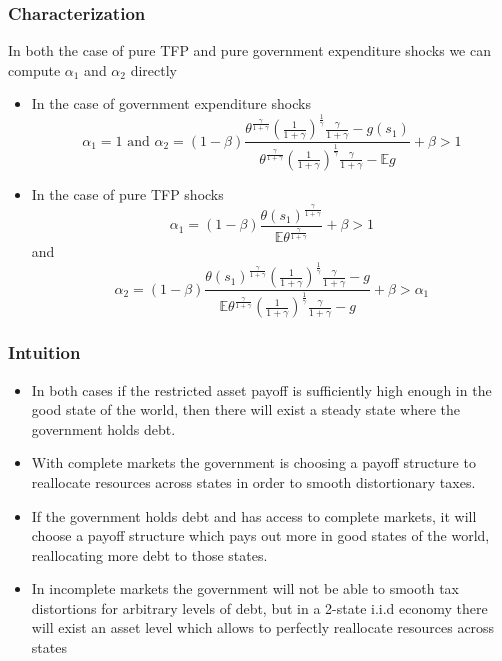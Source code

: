 \documentclass{beamer}
\newcommand{\EE}{\mathbb E}
\begin{document}
\begin{frame}
 \frametitle{Characterization}
	In both the case of pure TFP and pure government expenditure shocks we can compute $\alpha_1$ and $\alpha_2$ directly
	\begin{itemize}
		\item In the case of government expenditure shocks
		\[
			\alpha_1 = 1 \text{  and }  \alpha_2 = (1-\beta)\frac{\theta^\frac{\gamma}{1+\gamma}\left(\frac{1}{1+\gamma}\right)^\frac1\gamma\frac{\gamma}{1+\gamma}-g(s_1)}{\theta^\frac{\gamma}{1+\gamma}\left(\frac{1}{1+\gamma}\right)^\frac1\gamma\frac{\gamma}{1+\gamma}-\EE g} +\beta>1
		\]
		\item In the case of pure TFP shocks
		\[
			\alpha_1 = (1-\beta)\frac{\theta(s_1)^\frac{\gamma}{1+\gamma}}{\EE\theta^\frac{\gamma}{1+\gamma}}+\beta > 1
		\]and
		\[
		\alpha_2 = (1-\beta)\frac{\theta(s_1)^\frac{\gamma}{1+\gamma}\left(\frac{1}{1+\gamma}\right)^\frac1\gamma\frac{\gamma}{1+\gamma}-g}{\EE\theta^\frac{\gamma}{1+\gamma}\left(\frac{1}{1+\gamma}\right)^\frac1\gamma\frac{\gamma}{1+\gamma}-g}+\beta>\alpha_1
		\]
	\end{itemize}
 \end{frame}

 \begin{frame}
  \frametitle{Intuition}
	\begin{itemize}
		\item  In both cases if the restricted asset payoff is sufficiently high enough in the good state of the world, then there will exist a steady state where the government holds debt.
		\item With complete markets the government is choosing a payoff structure to reallocate resources across states in order to smooth distortionary taxes.
		\item If the government holds debt and has access to complete markets, it will choose a payoff structure which pays out more in good states of the world, reallocating more debt to those states.
		\item In incomplete markets the government will not be able to smooth tax distortions for arbitrary levels of debt, but in a 2-state i.i.d economy there will exist an asset level which allows to perfectly reallocate resources across states
	\end{itemize}
 \end{frame}
\end{document}
